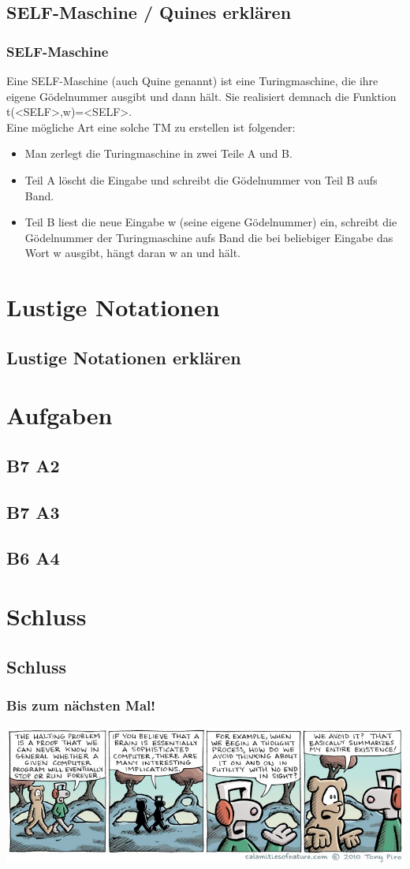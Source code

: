 \subsection{SELF-Maschine / Quines erklären}
\begin{frame}
\frametitle{SELF-Maschine}
Eine SELF-Maschine (auch Quine genannt) ist eine Turingmaschine, die ihre eigene Gödelnummer ausgibt und dann hält. Sie realisiert demnach die Funktion t(<SELF>,w)=<SELF>.\\
Eine mögliche Art eine solche TM zu erstellen ist folgender:
\begin{itemize}
\item Man zerlegt die Turingmaschine in zwei Teile A und B. 
\item Teil A löscht die Eingabe und schreibt die Gödelnummer von Teil B aufs Band.
\item Teil B liest die neue Eingabe w (seine eigene Gödelnummer) ein, schreibt die Gödelnummer der Turingmaschine aufs Band die bei beliebiger Eingabe das Wort w ausgibt, hängt daran w an und hält.
\end{itemize}
\end{frame}

\section{Lustige Notationen}
\subsection{Lustige Notationen erklären}

\section{Aufgaben}
\subsection{B7 A2}
\subsection{B7 A3}
\subsection{B6 A4}

\section{Schluss}
\subsection{Schluss}
\begin{frame}
\frametitle{Bis zum nächsten Mal!}
\begin{center}
  \includegraphics[width=1.59 \textheight]{images/halting.jpg}
\end{center}
\end{frame}

